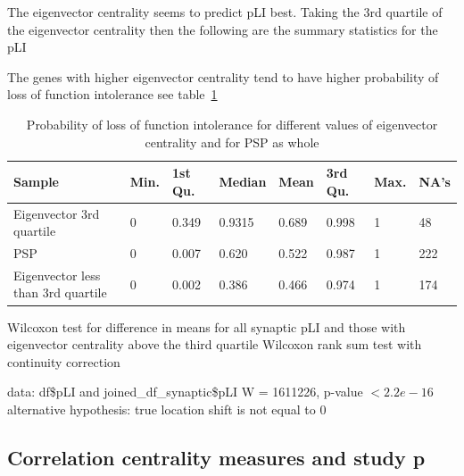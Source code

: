 The eigenvector centrality seems to predict pLI best. Taking the 3rd quartile of the eigenvector centrality then the following are the summary statistics for the pLI

The genes with higher eigenvector centrality tend to have higher probability of loss of function intolerance see table~\ref{tab:pli and eigenvector centrality quartiles}

\begin{table}[]
    \centering
    \begin{tabular}{llllllll}
    \toprule
      Sample &  Min. &1st Qu.&  Median &   Mean& 3rd Qu.&    Max. &   NA's     \\
      \midrule
     Eigenvector 3rd quartile  &0& 0.349& 0.9315& 0.689& 0.998& 1&     48  \\ 
     PSP &0&0.007&0.620&0.522&0.987&  1 & 222\\
     Eigenvector less than 3rd quartile &0&0.002&0.386&0.466&0.974&1&    174\\
     \bottomrule
    \end{tabular}
    \caption{Probability of loss of function intolerance for different values of eigenvector centrality and for PSP as whole}
    \label{tab:pli and eigenvector centrality quartiles}
\end{table}




Wilcoxon test for difference in means for all synaptic pLI and those with eigenvector centrality above the third quartile
        Wilcoxon rank sum test with continuity correction

data:  df\$pLI and joined\_df\_synaptic\$pLI
W = 1611226, p-value $< 2.2e-16$
alternative hypothesis: true location shift is not equal to 0



\subsection{Correlation centrality measures and study p}



